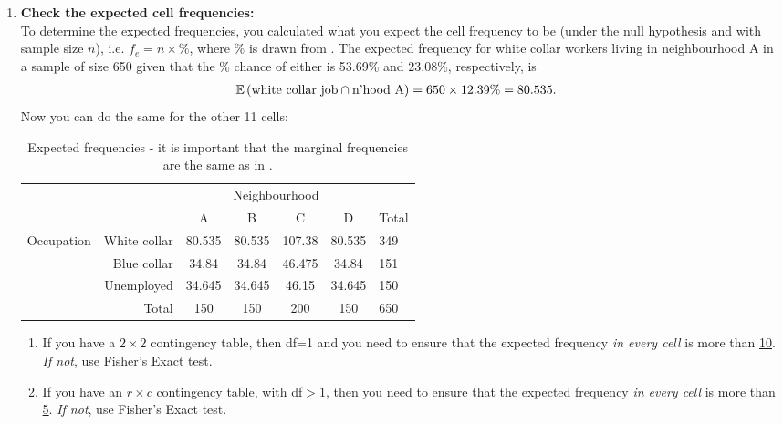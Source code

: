 \begin{enumerate}
    \item \textbf{Check the expected cell frequencies:} \\
    To determine the expected frequencies, you calculated what you expect the cell frequency to be (under the null hypothesis and with sample size $n$), i.e. $f_e = n \times \%$, where \% is drawn from . The expected frequency for white collar workers living in neighbourhood A in a sample of size 650 given that the \% chance of either is 53.69\% and 23.08\%, respectively, is 
    \begin{align}
        \operatorname{\mathbb{E}} \left( \text{white collar job} \cap \text{n'hood A}\right) &= 650 \times 12.39\% = 80.535.
    \end{align}
    Now you can do the same for the other 11 cells:
    \begin{table}[h]
    \centering
    \begin{tabular}{rr|cccc|l}
        {} & {} & \multicolumn{4}{c|}{Neighbourhood} & {} \\
        {} & {} & A & B & C & D & Total \\ \hline
        \multicolumn{1}{r}{\multirow{3}{*}{Occupation}} & White collar & 80.535 & 80.535 & 107.38 & 80.535 & 349 \\
        \multicolumn{1}{r}{} & Blue collar & 34.84 & 34.84 & 46.475 & 34.84 & 151 \\
        \multicolumn{1}{r}{} & Unemployed & 34.645 & 34.645 & 46.15 & 34.645 & 150 \\ \hline
        {} & Total & 150 & 150 & 200 & 150 & 650
    \end{tabular}
    \caption{Expected frequencies - it is important that the marginal frequencies are the same as in .}
    \label{tab:4wk6}
    \end{table}
    \begin{enumerate}
        \item If you have a $2 \times 2$ contingency table, then df=1 and you need to ensure that the expected frequency \textit{in every cell} is more than \underline{10}. \textit{If not}, use Fisher's Exact test. 
        
        \item If you have an $r \times c$ contingency table, with df$>1$, then you need to ensure that the expected frequency \textit{in every cell} is more than \underline{5}. \textit{If not}, use Fisher's Exact test.
    \end{enumerate}


\end{enumerate}
